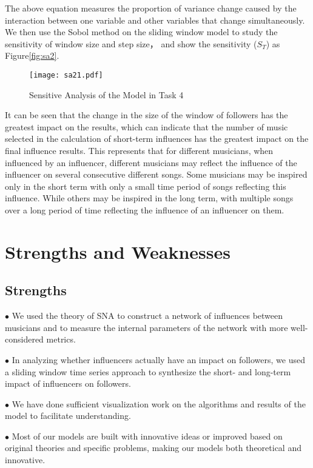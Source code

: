 \documentclass[12pt]{article}  %
\begin{document}
The above equation measures the proportion of variance change caused by the interaction between one variable and other variables that change simultaneously. We then use the Sobol method on the sliding window model to study the sensitivity of window size and step size， and show the  sensitivity ($S_T$) as Figure\eqref{fig:sa2}.

\begin{figure}[htbp]
	\centering
	\texttt{[image: sa21.pdf]}
	\caption{Sensitive Analysis of the Model in Task 4}\label{fig:sa2}
\end{figure}

It can be seen that the change in the size of the window of followers has the greatest impact on the results, which can indicate that the number of music selected in the calculation of short-term influences has the greatest impact on the final influence results. This represents that for different musicians, when influenced by an influencer, different musicians may reflect the influence of the influencer on several consecutive different songs. Some musicians may be inspired only in the short term with only a small time period of songs reflecting this influence. While others may be inspired in the long term, with multiple songs over a long period of time reflecting the influence of an influencer on them.
\vspace{-0.7cm}
\section{Strengths and Weaknesses}
\vspace{-0.3cm}
\subsection{Strengths}
$\bullet$ We used the theory of SNA to construct a network of influences between musicians and to measure the internal parameters of the network with more well-considered metrics.

$\bullet$ In analyzing whether influencers actually have an impact on followers, we used a sliding window time series approach to synthesize the short- and long-term impact of influencers on followers.

$\bullet$ We have done sufficient visualization work on the algorithms and results of the model to facilitate understanding.

$\bullet$ Most of our models are built with innovative ideas or improved based on original theories and specific problems, making our models both theoretical and innovative.
\end{document}
